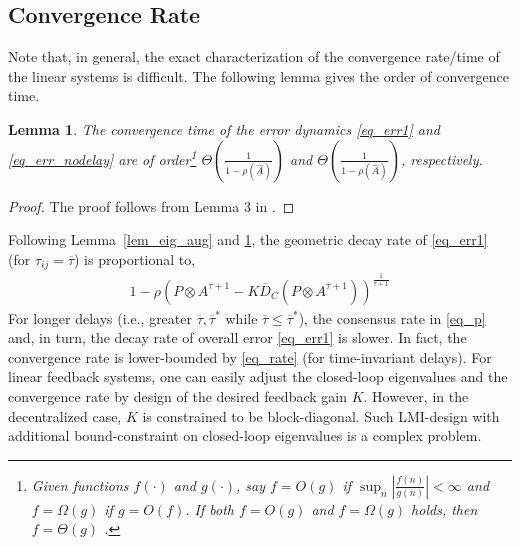 \documentclass[journal]{IEEEtran}
\newcommand{\tb}{\color{blue}}
\newtheorem{lem}{Lemma}
\begin{document}
\subsection{Convergence Rate}
Note that, in general, the exact characterization of the convergence rate/time of the linear systems is difficult. The following lemma gives the order of convergence time. 
\begin{lem}  \label{lem_rate}
	The convergence time of the error dynamics \eqref{eq_err1} and \eqref{eq_err_nodelay} are  of order\footnote{Given functions $f(\cdot)$ and $g(\cdot)$, say $f = O(g)$ if
$\sup_n |\frac{f(n)}{g(n)}| < \infty$ and $f = \Omega(g)$ if $g = O(f)$. If both $f = O(g)$ and
$f = \Omega(g)$ holds, then $f = \Theta(g)$ \cite{ghaderi2014opinion}.}  $\Theta(\frac{1}{1-\rho(\underline{\widehat{A}})})$ and $\Theta(\frac{1}{1-\rho(\widehat{A})})$, respectively. 
\end{lem}
\begin{proof}
	The proof follows from Lemma 3 in \cite{ghaderi2014opinion}.
\end{proof}
 Following Lemma~\ref{lem_eig_aug} and \ref{lem_rate}, the geometric decay rate of  \eqref{eq_err1} (for $\tau_{ij}=\overline{\tau}$) is  proportional to, 
 \begin{align} \label{eq_rate}
     1-\rho(P\otimes A^{\overline{\tau}+1} - K \overline{D}_C (P\otimes A^{\overline{\tau}+1}) )^{\frac{1}{\overline{\tau}+1}}
 \end{align}
For longer delays (i.e., greater $\overline{\tau},\overline{\tau}^*$ while $\overline{\tau}\leq \overline{\tau}^*$), the consensus rate in \eqref{eq_p}  and, in turn,  the decay rate of overall error \eqref{eq_err1} is slower. In fact, the convergence rate  is lower-bounded by \eqref{eq_rate} (for time-invariant delays).
For linear feedback systems, one can easily adjust the closed-loop eigenvalues and the convergence rate by  design of the desired feedback gain $K$. However, in the decentralized case,  $K$ is constrained to be block-diagonal. Such LMI-design with additional bound-constraint on closed-loop eigenvalues is a complex problem.   
  
\end{document}
